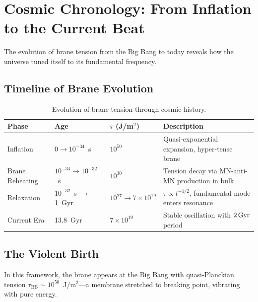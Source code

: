 
\chapter{Cosmic Chronology: From Inflation to the Current Beat}
\label{ch:chronology}

The evolution of brane tension from the Big Bang to today reveals how the universe tuned itself to its fundamental frequency.

\section{Timeline of Brane Evolution}
\label{sec:timeline}

\begin{table}[h]
\centering
\caption{Evolution of brane tension through cosmic history.}
\label{tab:timeline}
\begin{tabular}{@{}llll@{}}
\toprule
\textbf{Phase} & \textbf{Age} & \textbf{$\tau$ (J/m$^2$)} & \textbf{Description} \\
\midrule
Inflation & $0 \to 10^{-34}$~s & $10^{50}$ & Quasi-exponential expansion, hyper-tense brane \\
Brane Reheating & $10^{-34} \to 10^{-32}$~s & $10^{30}$ & Tension decay via MN-anti-MN production in bulk \\
Relaxation & $10^{-32}$~s $\to$ 1~Gyr & $10^{27} \to 7 \times 10^{19}$ & $\tau \propto t^{-1/2}$, fundamental mode enters resonance \\
Current Era & 13.8~Gyr & $7 \times 10^{19}$ & Stable oscillation with $2\,\text{Gyr}$ period \\
\bottomrule
\end{tabular}
\end{table}

\section{The Violent Birth}
\label{sec:violent_birth}

In this framework, the brane appears at the Big Bang with quasi-Planckian tension $\tau_\text{BB} \sim 10^{50}$~J/m$^2$---a membrane stretched to breaking point, vibrating with pure energy.

